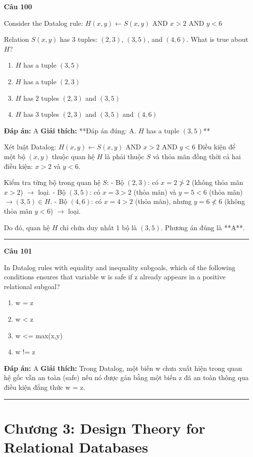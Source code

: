 \documentclass[11pt,a4paper]{article}
\newenvironment{question}[1]{%
  \par\vspace{1em}\noindent\textbf{\large Câu #1}\par\vspace{0.4em}
}{%
  \par\vspace{1em}\hrule\vspace{0.6em}
}
\newenvironment{choices}{%
  \begin{enumerate}[label=\textbf{\Alph*.},leftmargin=2.2em,itemsep=2pt,topsep=3pt]
}{%
  \end{enumerate}
}
\newcommand{\choice}{\item}
\begin{document}
\begin{question}{100}
Consider the Datalog rule:
\(H(x,y) \leftarrow S(x,y) \text{ AND } x > 2 \text{ AND } y < 6\)

Relation \(S(x, y)\) has 3 tuples: \((2, 3)\), \((3, 5)\), and \((4, 6)\). What is true about \(H\)?
\begin{choices}
\choice \(H\) has a tuple \((3, 5)\)
\choice \(H\) has a tuple \((2, 3)\)
\choice \(H\) has 2 tuples \((2, 3)\) and \((3, 5)\)
\choice \(H\) has 3 tuples \((2, 3)\) and \((3, 5)\) and \((4, 6)\)
\end{choices}
\textbf{Đáp án:} A
\textbf{Giải thích:} **Đáp án đúng: A. \(H\) has a tuple \((3, 5)\)**

Xét luật Datalog: \(H(x,y) \leftarrow S(x,y) \text{ AND } x > 2 \text{ AND } y < 6\)
Điều kiện để một bộ \((x, y)\) thuộc quan hệ \(H\) là phải thuộc \(S\) và thỏa mãn đồng thời cả hai điều kiện: \(x > 2\) và \(y < 6\).

Kiểm tra từng bộ trong quan hệ \(S\):
- Bộ \((2, 3)\): có \(x = 2 \ngtr 2\) (không thỏa mãn \(x > 2\)) \(\rightarrow\) loại.
- Bộ \((3, 5)\): có \(x = 3 > 2\) (thỏa mãn) và \(y = 5 < 6\) (thỏa mãn) \(\rightarrow (3, 5) \in H\).
- Bộ \((4, 6)\): có \(x = 4 > 2\) (thỏa mãn), nhưng \(y = 6 \nless 6\) (không thỏa mãn \(y < 6\)) \(\rightarrow\) loại.

Do đó, quan hệ \(H\) chỉ chứa duy nhất 1 bộ là \((3, 5)\). Phương án đúng là **A**.
\end{question}

\begin{question}{101}
In Datalog rules with equality and inequality subgoals, which of the following conditions ensures that variable w is safe if z already appears in a positive relational subgoal?
\begin{choices}
\choice w = z
\choice w < z
\choice w <= max(x,y)
\choice w != z
\end{choices}
\textbf{Đáp án:} A
\textbf{Giải thích:} Trong Datalog, một biến w chưa xuất hiện trong quan hệ gốc vẫn an toàn (safe) nếu nó được gán bằng một biến z đã an toàn thông qua điều kiện đẳng thức w = z.
\end{question}


\newpage
\section*{Chương 3: Design Theory for Relational Databases}
\end{document}
